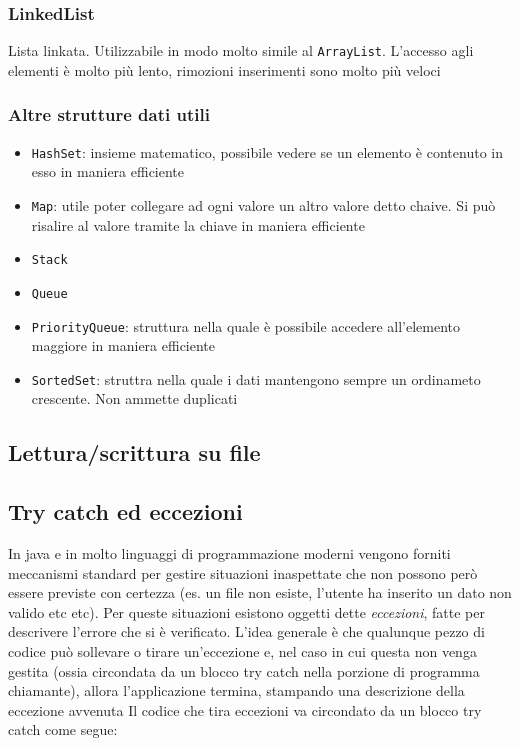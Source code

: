\subsubsection{LinkedList}
Lista linkata. Utilizzabile in modo molto simile al \verb|ArrayList|. L'accesso agli elementi è molto più lento, rimozioni inserimenti sono molto più veloci

\subsubsection{Altre strutture dati utili}
\begin{itemize}
	\item \verb|HashSet|: insieme matematico, possibile vedere se un elemento è contenuto in esso in maniera efficiente
	\item \verb|Map|: utile poter collegare ad ogni valore un altro valore detto chaive. Si può risalire al valore tramite la chiave in maniera efficiente
	\item \verb|Stack|
	\item \verb|Queue|
	\item \verb|PriorityQueue|: struttura nella quale è possibile accedere all'elemento maggiore in maniera efficiente
	\item \verb|SortedSet|: struttra nella quale i dati mantengono sempre un ordinameto crescente. Non ammette duplicati
\end{itemize}

\subsection{Lettura/scrittura su file}
\subsection{Try catch ed eccezioni}
In java e in molto linguaggi di programmazione moderni vengono forniti meccanismi standard per gestire situazioni inaspettate che non possono però essere previste con certezza (es. un file non esiste, l'utente ha inserito un dato non valido etc etc). Per queste situazioni esistono oggetti dette \textit{eccezioni}, fatte per descrivere l'errore che si è verificato.
\vskip3mm
L'idea generale è che qualunque pezzo di codice può sollevare o tirare un'eccezione e, nel caso in cui questa non venga gestita (ossia circondata da un blocco try catch nella porzione di programma chiamante), allora l'applicazione termina, stampando una descrizione della eccezione avvenuta
\vskip3mm
Il codice che tira eccezioni va circondato da un blocco try catch come segue:

